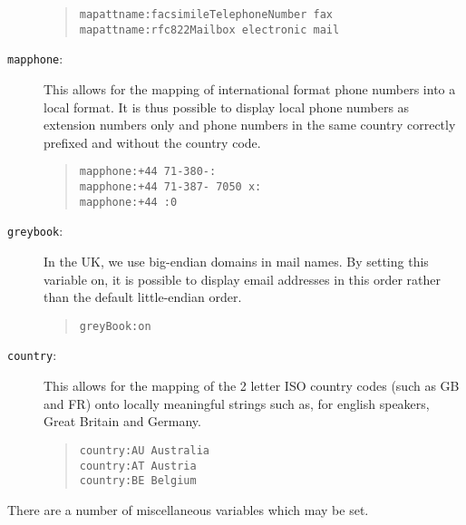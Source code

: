 \begin{description}
\begin{quote}\small\begin{verbatim}
mapattname:facsimileTelephoneNumber fax
mapattname:rfc822Mailbox electronic mail
\end{verbatim}\end{quote}

\item [\verb+mapphone+:]  This allows for the mapping of international format phone
numbers into a local format.  It is thus possible to display local phone
numbers as extension numbers only and phone numbers in the same country
correctly prefixed and without the country code.

\begin{quote}\small\begin{verbatim}
mapphone:+44 71-380-:
mapphone:+44 71-387- 7050 x:
mapphone:+44 :0
\end{verbatim}\end{quote}

\item [\verb+greybook+:]  In the UK, we use big-endian domains in mail names.  By
setting this variable on, it is possible to display email addresses in this
order rather than the default little-endian order.

\begin{quote}\small\begin{verbatim}
greyBook:on
\end{verbatim}\end{quote}

\item [\verb+country+:]  This allows for the mapping of the 2 letter ISO country
codes (such as GB and FR) onto locally meaningful strings such as, for
english speakers, Great Britain and Germany.

\begin{quote}\small\begin{verbatim}
country:AU Australia
country:AT Austria
country:BE Belgium
\end{verbatim}\end{quote}

\end{description}

There are a number of miscellaneous variables which may be set.

